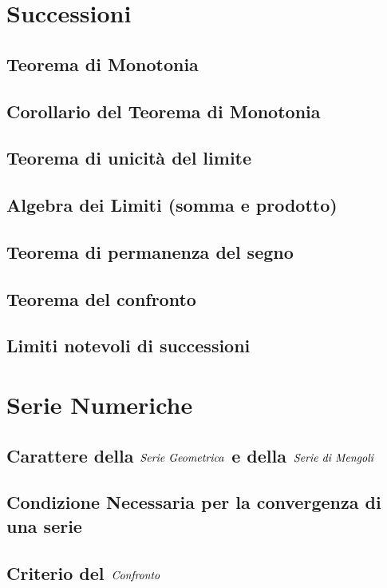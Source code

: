 \documentclass[11pt, a4paper]{article}
\begin{document}
\newpage

\section{Successioni}
\subsection{Teorema di Monotonia}
\subsection{Corollario del Teorema di Monotonia}
\subsection{Teorema di unicità del limite}
\subsection{Algebra dei Limiti (somma e prodotto)}
\subsection{Teorema di permanenza del segno}
\subsection{Teorema del confronto}
\subsection{Limiti notevoli di successioni}

\newpage

\section{Serie Numeriche}
\subsection{Carattere della $\emph{Serie Geometrica}$ e della $\emph{Serie di Mengoli}$}
\subsection{Condizione Necessaria per la convergenza di una serie}
\subsection{Criterio del $\emph{Confronto}$}
\end{document}
